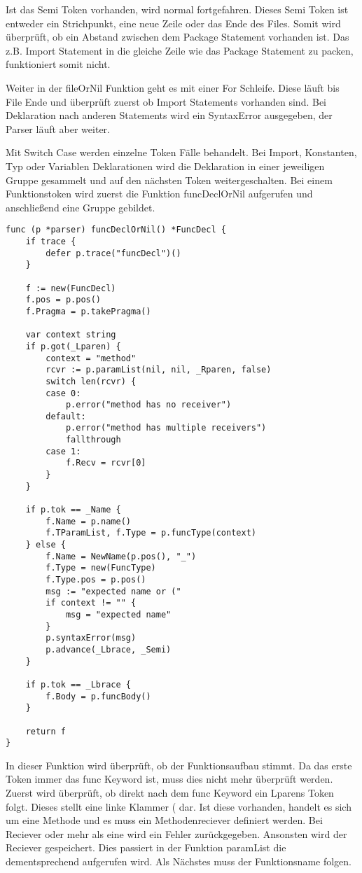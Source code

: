 Ist das Semi Token vorhanden, wird normal fortgefahren. Dieses Semi Token ist entweder ein Strichpunkt, eine neue Zeile oder das Ende des Files. Somit wird überprüft, ob ein Abstand zwischen dem Package Statement vorhanden ist. Das z.B. Import Statement in die gleiche Zeile wie das Package Statement zu packen, funktioniert somit nicht.

Weiter in der fileOrNil Funktion geht es mit einer For Schleife. Diese läuft bis File Ende und überprüft zuerst ob Import Statements vorhanden sind. Bei Deklaration nach anderen Statements wird ein SyntaxError ausgegeben, der Parser läuft aber weiter. 

Mit Switch Case werden einzelne Token Fälle behandelt. Bei Import, Konstanten, Typ oder Variablen Deklarationen wird die Deklaration in einer jeweiligen Gruppe gesammelt und auf den nächsten Token weitergeschalten. Bei einem Funktionstoken wird zuerst die Funktion funcDeclOrNil aufgerufen und anschließend eine Gruppe gebildet.

\begin{lstlisting}
func (p *parser) funcDeclOrNil() *FuncDecl {
	if trace {
		defer p.trace("funcDecl")()
	}

	f := new(FuncDecl)
	f.pos = p.pos()
	f.Pragma = p.takePragma()

	var context string
	if p.got(_Lparen) {
		context = "method"
		rcvr := p.paramList(nil, nil, _Rparen, false)
		switch len(rcvr) {
		case 0:
			p.error("method has no receiver")
		default:
			p.error("method has multiple receivers")
			fallthrough
		case 1:
			f.Recv = rcvr[0]
		}
	}

	if p.tok == _Name {
		f.Name = p.name()
		f.TParamList, f.Type = p.funcType(context)
	} else {
		f.Name = NewName(p.pos(), "_")
		f.Type = new(FuncType)
		f.Type.pos = p.pos()
		msg := "expected name or ("
		if context != "" {
			msg = "expected name"
		}
		p.syntaxError(msg)
		p.advance(_Lbrace, _Semi)
	}

	if p.tok == _Lbrace {
		f.Body = p.funcBody()
	}

	return f
}
\end{lstlisting}
In dieser Funktion wird überprüft, ob der Funktionsaufbau stimmt. Da das erste Token immer das func Keyword ist, muss dies nicht mehr überprüft werden. Zuerst wird überprüft, ob direkt nach dem func Keyword ein Lparens Token folgt. Dieses stellt eine linke Klammer ( dar. Ist diese vorhanden, handelt es sich um eine Methode und es muss ein Methodenreciever definiert werden. Bei Reciever oder  mehr als eine wird ein Fehler zurückgegeben. Ansonsten wird der Reciever gespeichert. Dies passiert in der Funktion paramList die dementsprechend aufgerufen wird.
Als Nächstes muss der Funktionsname folgen. 

